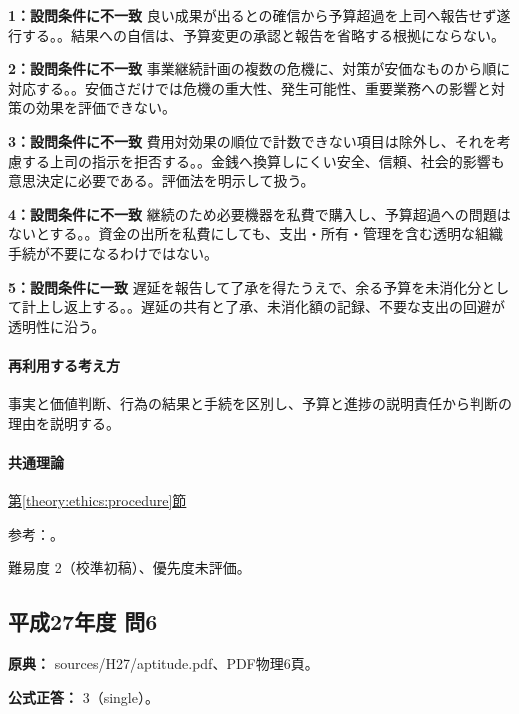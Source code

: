 \noindent\textbf{1：設問条件に不一致} 良い成果が出るとの確信から予算超過を上司へ報告せず遂行する。。結果への自信は、予算変更の承認と報告を省略する根拠にならない。\par

\noindent\textbf{2：設問条件に不一致} 事業継続計画の複数の危機に、対策が安価なものから順に対応する。。安価さだけでは危機の重大性、発生可能性、重要業務への影響と対策の効果を評価できない。\par

\noindent\textbf{3：設問条件に不一致} 費用対効果の順位で計数できない項目は除外し、それを考慮する上司の指示を拒否する。。金銭へ換算しにくい安全、信頼、社会的影響も意思決定に必要である。評価法を明示して扱う。\par

\noindent\textbf{4：設問条件に不一致} 継続のため必要機器を私費で購入し、予算超過への問題はないとする。。資金の出所を私費にしても、支出・所有・管理を含む透明な組織手続が不要になるわけではない。\par

\noindent\textbf{5：設問条件に一致} 遅延を報告して了承を得たうえで、余る予算を未消化分として計上し返上する。。遅延の共有と了承、未消化額の記録、不要な支出の回避が透明性に沿う。\par

\paragraph{再利用する考え方} 事実と価値判断、行為の結果と手続を区別し、予算と進捗の説明責任から判断の理由を説明する。

\paragraph{共通理論} \hyperref[theory:ethics:procedure]{第\ref*{theory:ethics:procedure}節}

\par 参考：\cite{ipej_ethics2023}。

\par 難易度 2（校準初稿）、優先度未評価。

\subsection{平成27年度 問6}
\label{q:h27-reg-apt-06}

\noindent\textbf{原典：} sources/H27/aptitude.pdf、PDF物理6頁。

\textbf{公式正答：} 3（single）。

